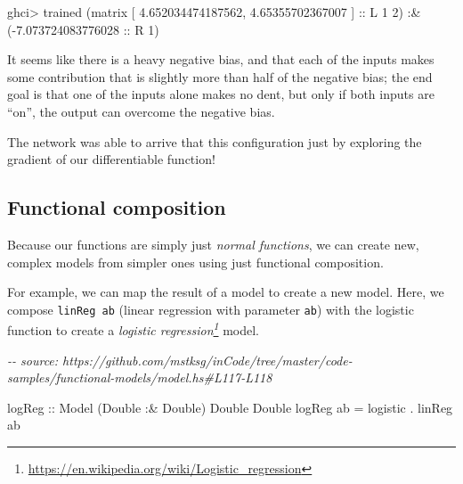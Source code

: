 \documentclass[]{article}
\newenvironment{Shaded}{}{}
\newcommand{\CommentTok}[1]{\textcolor[rgb]{0.38,0.63,0.69}{\textit{#1}}}
\newcommand{\DataTypeTok}[1]{\textcolor[rgb]{0.56,0.13,0.00}{#1}}
\newcommand{\DecValTok}[1]{\textcolor[rgb]{0.25,0.63,0.44}{#1}}
\newcommand{\FloatTok}[1]{\textcolor[rgb]{0.25,0.63,0.44}{#1}}
\newcommand{\NormalTok}[1]{#1}
\newcommand{\OperatorTok}[1]{\textcolor[rgb]{0.40,0.40,0.40}{#1}}
\newcommand{\OtherTok}[1]{\textcolor[rgb]{0.00,0.44,0.13}{#1}}
\renewcommand{\href}[2]{#2\footnote{\url{#1}}}
\begin{document}
\begin{Shaded}
\begin{Highlighting}[]
\NormalTok{ghci}\OperatorTok{>}\NormalTok{ trained}
\NormalTok{(matrix}
\NormalTok{ [ }\FloatTok{4.652034474187562}\NormalTok{, }\FloatTok{4.65355702367007}\NormalTok{ ]}\OtherTok{ ::} \DataTypeTok{L} \DecValTok{1} \DecValTok{2}\NormalTok{) }\OperatorTok{:\&}\NormalTok{ (}\OperatorTok{{-}}\FloatTok{7.073724083776028}\OtherTok{ ::} \DataTypeTok{R} \DecValTok{1}\NormalTok{)}
\end{Highlighting}
\end{Shaded}

It seems like there is a heavy negative bias, and that each of the inputs makes
some contribution that is slightly more than half of the negative bias; the end
goal is that one of the inputs alone makes no dent, but only if both inputs are
``on'', the output can overcome the negative bias.

The network was able to arrive that this configuration just by exploring the
gradient of our differentiable function!

\hypertarget{functional-composition}{%
\subsection{Functional composition}\label{functional-composition}}

Because our functions are simply just \emph{normal functions}, we can create
new, complex models from simpler ones using just functional composition.

For example, we can map the result of a model to create a new model. Here, we
compose \texttt{linReg\ ab} (linear regression with parameter \texttt{ab}) with
the logistic function to create a
\emph{\href{https://en.wikipedia.org/wiki/Logistic_regression}{logistic
regression}} model.

\begin{Shaded}
\begin{Highlighting}[]
\CommentTok{{-}{-} source: https://github.com/mstksg/inCode/tree/master/code{-}samples/functional{-}models/model.hs\#L117{-}L118}

\OtherTok{logReg ::} \DataTypeTok{Model}\NormalTok{ (}\DataTypeTok{Double} \OperatorTok{:\&} \DataTypeTok{Double}\NormalTok{) }\DataTypeTok{Double} \DataTypeTok{Double}
\NormalTok{logReg ab }\OtherTok{=}\NormalTok{ logistic }\OperatorTok{.}\NormalTok{ linReg ab}
\end{Highlighting}
\end{Shaded}
\end{document}
